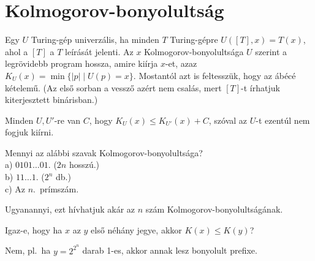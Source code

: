 























\chapter{Kolmogorov-bonyolultság}

 Egy $U$ Turing-g\'ep univerz\'alis, ha minden $T$ Turing-g\'epre $U([T],x)=T(x)$, ahol a $[T]$ a $T$ le\'ir\'as\'at jelenti. Az $x$ Kolmogorov-bonyolultsága $U$ szerint a legr\"ovidebb program hossza, amire ki\'irja $x$-et, azaz $K_U(x)=\min \{|p|\mid U(p)=x\}$. Mostant\'ol azt is feltessz\"uk, hogy az \'ab\'ec\'e k\'etelem\H u. (Az els\H o sorban a vessz\H o az\'ert nem csal\'as, mert $[T]$-t \'irhatjuk kiterjesztett bin\'arisban.)


\begin{Exercise}[counter={sorszam}, difficulty=0]
	Minden $U,U'$-re van $C$, hogy $K_U(x)\le K_{U'}(x)+C$, sz\'oval az $U$-t ezent\'ul nem fogjuk ki\'irni.
\end{Exercise}	

\begin{Exercise}[counter={sorszam}, difficulty=0]
	Mennyi az alábbi szavak Kolmogorov-bonyolultsága?\\
	a) $0101\ldots 01$. ($2n$ hosszú.)\\
	b) $11\ldots 1$. ($2^n$ db.)\\
	c) Az $n$.\ prímszám.
\end{Exercise}	
\begin{Answer}
	Ugyanannyi, ezt h\'ivhatjuk ak\'ar az $n$ sz\'am Kolmogorov-bonyolultság\'anak.
\end{Answer}

\begin{Exercise}[counter={sorszam}, difficulty=0]
	Igaz-e, hogy ha $x$ az $y$ els\H o n\'eh\'any jegye, akkor $K(x)\le K(y)$?
\end{Exercise}	
\begin{Answer}
	Nem, pl.\ ha $y=2^{2^n}$ darab 1-es, akkor annak lesz bonyolult prefixe.
\end{Answer}

